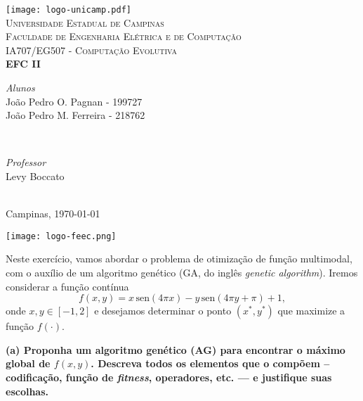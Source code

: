 \documentclass[a4paper, 12pt]{article}
\newcommand{\sen}{\hspace{2pt}\mathrm{sen}}
\newcommand{\fitness}{\textit{fitness}\xspace}
\begin{document}
\begin{titlepage}
\newcommand{\HRule}{\rule{\linewidth}{0.5mm}}
	
\centering

\texttt{[image: logo-unicamp.pdf]}\\[0.5cm]	
\textsc{\Large Universidade Estadual de Campinas}\\[2.0cm]
\textsc{\large Faculdade de Engenharia Elétrica e de Computação}\\[0.5cm]
	
\textsc{IA707/EG507 - Computação Evolutiva}\\[2.5cm]
	
{\LARGE \bfseries EFC II}\\[3.5cm]

\begin{minipage}[t]{0.4\textwidth}
	\begin{flushleft}
    \textit{Alunos}\\
    João Pedro O. Pagnan - 199727\\
    João Pedro M. Ferreira - 218762
	\end{flushleft}
\end{minipage}
~
\begin{minipage}[t]{0.4\textwidth}
	\begin{flushright}
		\textit{Professor}\\
		Levy Boccato
	\end{flushright}
\end{minipage}\\[4.5cm]

{Campinas, \today}
	
\vfill\vfill\vfill\vfill\vfill

\texttt{[image: logo-feec.png]}\\[0.5cm]
\vfill 
	
\end{titlepage}

\justify

Neste exercício, vamos abordar o problema de otimização de função multimodal, com o auxílio de um algoritmo genético (GA, do inglês \textit{genetic algorithm}). Iremos considerar a função contínua
$$f (x, y) = x \sen(4\pi x) - y \sen(4\pi y + \pi) + 1,$$
onde $x, y \in [-1, 2]$ e desejamos determinar o ponto $(x^{*} , y^{*})$ que maximize a função $f(\cdot )$.

\textbf{(a) Proponha um algoritmo genético (AG) para encontrar o máximo global de $f(x, y)$. Descreva todos os elementos que o compõem – codificação, função de \fitness, operadores, etc. — e justifique suas escolhas.}
\end{document}

